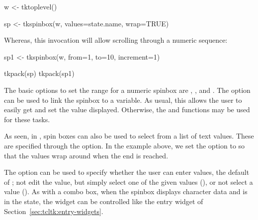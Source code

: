 \begin{Schunk}
\begin{Sinput}
 w <- tktoplevel()
\end{Sinput}
\end{Schunk}
\begin{Schunk}
\begin{Sinput}
 sp <- tkspinbox(w, values=state.name, wrap=TRUE)
\end{Sinput}
\end{Schunk}

Whereas, this invocation will allow scrolling through a numeric sequence:
\begin{Schunk}
\begin{Sinput}
 sp1 <- tkspinbox(w, from=1, to=10, increment=1)
\end{Sinput}
\end{Schunk}

\begin{Schunk}
\begin{Sinput}
 tkpack(sp)
 tkpack(sp1)
\end{Sinput}
\end{Schunk}


The basic options to set the range for a numeric spinbox are
, , and
.  The 
option can be used to link the spinbox to a \TCL\/ variable. As usual,
this allows the user to easily get and set the value
displayed. Otherwise, the  and 
functions may be used for these tasks. 

As seen, in \TK, spin boxes can also be used to select from a list of
text values. These are specified through the
 option. In the  example
above, we set the  option to  so
that the values wrap around when the end is reached.
 
The option  can be used to specify whether
the user can enter values, the default of ; not edit the
value, but simply select one of the given values (),
or not select a value ().  As with a combo box, when
the \TK\/ spinbox displays character data and is in the 
state, the widget can be controlled like the entry widget of
Section~\ref{sec:tcltk:entry-widgets}.




